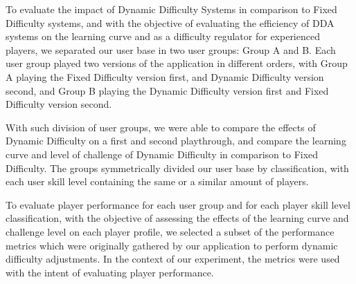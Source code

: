 To evaluate the impact of Dynamic Difficulty Systems in comparison to Fixed Difficulty systems, and with the objective of evaluating the efficiency of DDA systems on the learning curve and as a difficulty regulator for experienced players, we separated our user base in two user groups: Group A and B. Each user group played two versions of the application in different orders, with Group A playing the Fixed Difficulty version first, and Dynamic Difficulty version second, and Group B playing the Dynamic Difficulty version first and Fixed Difficulty version second.

With such division of user groups, we were able to compare the effects of Dynamic Difficulty on a first and second playthrough, and compare the learning curve and level of challenge of Dynamic Difficulty in comparison to Fixed Difficulty. The groups symmetrically divided our user base by classification, with each user skill level containing the same or a similar amount of players. 

To evaluate player performance for each user group and for each player skill level classification, with the objective of assessing the effects of the learning curve and challenge level on each player profile, we selected a subset of the performance metrics which were originally gathered by our application to perform dynamic difficulty adjustments. In the context of our experiment, the metrics were used with the intent of evaluating player performance.


